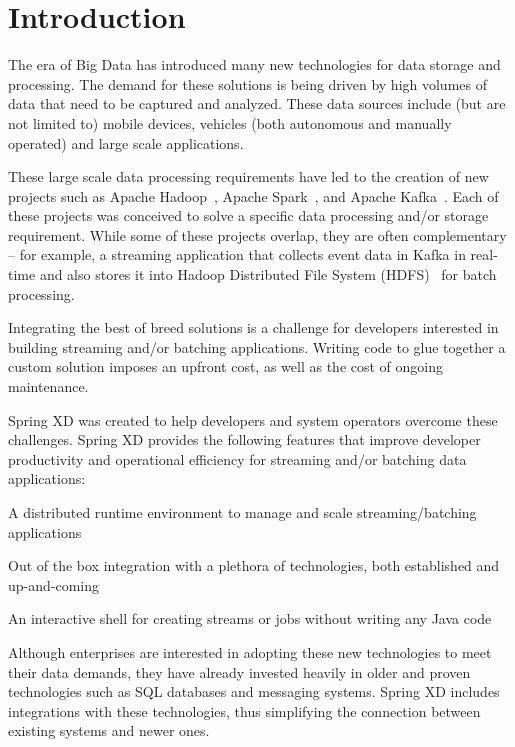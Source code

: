 \section{Introduction}

The era of Big Data has introduced many new technologies for data storage
and processing. The demand for these solutions is being driven by high
volumes of data that need to be captured and analyzed. These data sources
include (but are not limited to) mobile devices, vehicles (both autonomous
and manually operated) and large scale applications.

These large scale data processing requirements have led to the creation
of new projects such as Apache Hadoop~\cite{hadoop}, Apache Spark~\cite{spark},
and Apache Kafka~\cite{kafka}. Each of these projects was conceived
to solve a specific data processing and/or storage requirement. While some
of these projects overlap, they are often complementary -- for example,
a streaming application that collects event data in Kafka in real-time and also
stores it into Hadoop Distributed File System (HDFS)~\cite{hdfs} for batch processing.

Integrating the best of breed solutions is a challenge for developers
interested in building streaming and/or batching applications. Writing
code to glue together a custom solution imposes an upfront cost,
as well as the cost of ongoing maintenance.

Spring XD was created to help developers and system operators overcome
these challenges. Spring XD provides the following features that improve developer
productivity and operational efficiency for streaming and/or batching
data applications:
\begin{itemize*}
\item A distributed runtime environment to manage and scale streaming/batching applications
\item Out of the box integration with a plethora of technologies, both established
and up-and-coming
\item An interactive shell for creating streams or jobs without writing any Java code
\end{itemize*}

Although enterprises are interested in adopting these new technologies to
meet their data demands, they have already invested heavily in older and proven
technologies such as SQL databases and messaging systems. Spring XD includes
integrations with these technologies, thus simplifying the connection between
existing systems and newer ones.

